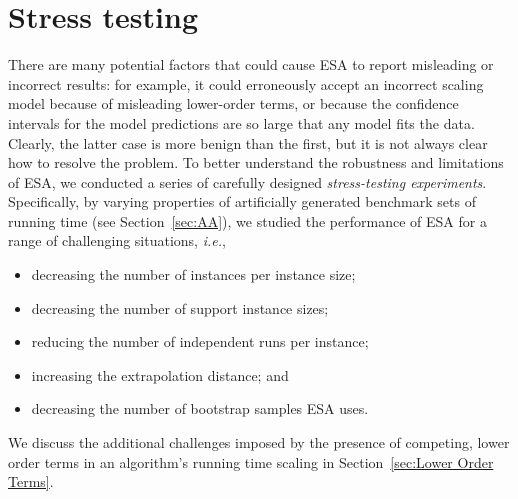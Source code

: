 \documentclass[aic]{iosart2x}
\newcommand{\ie}{\emph{i.e.}}
\begin{document}
\section{Stress testing}
\label{sec:Stress Testing}

There are many potential factors that could cause ESA to report misleading or incorrect results: for example, it could erroneously accept an incorrect scaling model because of misleading lower-order terms, or because the confidence intervals for the model predictions are so large that any model fits the data. 
Clearly, the latter case is more benign than the first, but it is not always clear how to resolve the problem. 
To better understand the robustness and limitations of ESA, we conducted a series of carefully designed \emph{stress-testing experiments}.
Specifically, by varying properties of artificially generated benchmark sets of running time (see Section~\ref{sec:AA}), we studied the performance of ESA for a range of challenging situations, \ie{},
\begin{itemize}
    \item decreasing the number of instances per instance size;
    \item decreasing the number of support instance sizes;
    \item reducing the number of independent runs per instance;
    \item increasing the extrapolation distance; and
    \item decreasing the number of bootstrap samples ESA uses.
\end{itemize}
We discuss the additional challenges imposed by the presence of competing, lower order terms in an algorithm's running time scaling in Section~\ref{sec:Lower Order Terms}.

\end{document}
